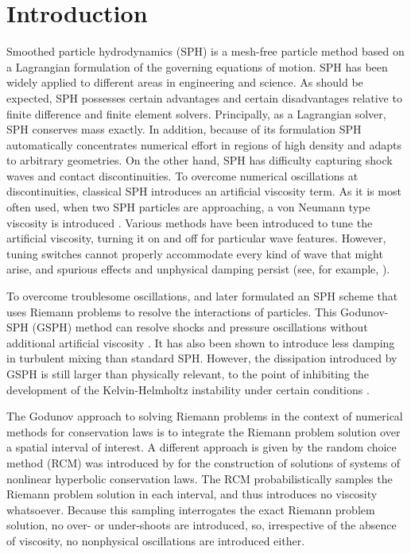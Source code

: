 \section{Introduction}
\label{intro}
Smoothed particle hydrodynamics (SPH) \citep{gingold1977smoothed,lucy1977numerical} is a mesh-free particle method based on a Lagrangian formulation of the governing equations of motion.
SPH has been widely applied to different areas in engineering and science. As should be expected, SPH possesses certain advantages and certain disadvantages relative to finite difference and finite element solvers. Principally, as a Lagrangian solver, SPH conserves mass exactly. 
In addition, because of its formulation SPH automatically concentrates numerical effort in regions of high density and adapts to arbitrary geometries. On the other hand, 
SPH has difficulty capturing shock waves and contact discontinuities. To overcome numerical oscillations at discontinuities, classical SPH introduces an artificial viscosity term. As it is most often used, when two SPH particles are approaching, a von Neumann type viscosity is introduced
\citep{monaghan1983shock, monaghan1997sph,klapp2012strong}. 
Various methods have been introduced to tune the artificial viscosity, turning it on and off for particular wave features. However, tuning switches cannot properly accommodate every kind of wave that might arise, and spurious effects and unphysical damping persist (see, for example, \citep{borgani2012hydrodynamic,flebbe1994smoothed,morris1997switch, dolag2005turbulent,cullen2010inviscid,sigalotti2008adaptive,puri2014comparison}).
 
To overcome troublesome oscillations, \citet{inutsuka2002reformulation} and later \citet{cha2003implementations} formulated an SPH scheme that uses Riemann problems to resolve the interactions of particles. This Godunov-SPH (GSPH) method can resolve shocks and pressure oscillations without additional artificial viscosity \citep{inutsuka2002reformulation, cha2003implementations,iwasaki2011smoothed, puri2014approximate,borgani2012hydrodynamic}. It has also been shown to introduce less damping in turbulent mixing \citep{cha2010kelvin, borgani2012hydrodynamic} than standard SPH. 
However, the dissipation introduced by GSPH is still larger than physically relevant, to the point
of inhibiting the development of the Kelvin-Helmholtz instability under certain conditions \citep{borgani2012hydrodynamic}.

The Godunov approach to solving Riemann problems in the context of numerical methods for conservation laws is to integrate the Riemann problem solution over a spatial interval of interest. A different approach is given by the random choice method (RCM) was introduced by \citet{glimm1965solutions} for the construction of solutions of systems of nonlinear hyperbolic conservation laws. The RCM probabilistically samples the Riemann problem solution in each interval, and thus introduces no viscosity whatsoever. Because this sampling interrogates the exact Riemann problem solution, no over- or under-shoots are introduced, so, irrespective of the absence of viscosity, no nonphysical oscillations are introduced either.

